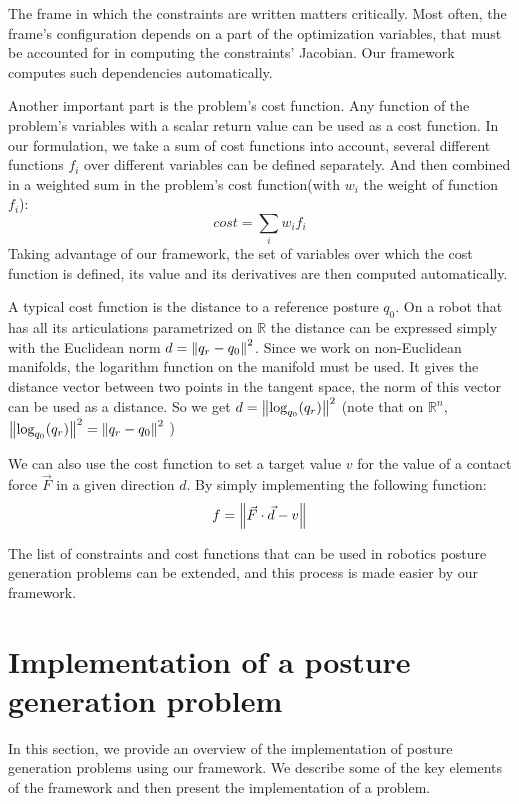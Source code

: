 The frame in which the constraints are written matters critically.
Most often, the frame's configuration depends on a part of the optimization variables, that must be accounted for in computing the constraints' Jacobian.
Our framework computes such dependencies automatically.

Another important part is the problem's cost function.
Any function of the problem's variables with a scalar return value can be used as a cost function.
In our formulation, we take a sum of cost functions into account, several different functions $f_i$ over different variables can be defined separately.
And then combined in a weighted sum in the problem's cost function(with $w_i$ the weight of function $f_i$):
\begin{equation}
  cost = \sum\limits_i w_i f_i
\end{equation}
Taking advantage of our framework, the set of variables over which the cost function is defined, its value and its derivatives are then computed automatically.

A typical cost function is the distance to a reference posture $q_0$.
On a robot that has all its articulations parametrized on $\mathbb{R}$ the distance can be expressed simply with the Euclidean norm $d = \left\| q_r-q_0 \right\|^2$.
Since we work on non-Euclidean manifolds, the logarithm function on the manifold must be used.
It gives the distance vector between two points in the tangent space, the norm of this vector can be used as a distance.
So we get $d = \left\| \text{log}_{q_0}(q_r) \right\|^2$ (note that on $\mathbb{R}^n$, $\left\| \text{log}_{q_0}(q_r) \right\|^2 = \left\| q_r - q_0 \right\|^2$ )

We can also use the cost function to set a target value $v$ for the value of a contact force $\vec{F}$ in a given direction $d$. By simply implementing the following function:
\begin{equation}
  f = \left\| \vec{F}\cdot\vec{d}-v \right\|
\end{equation}

The list of constraints and cost functions that can be used in robotics posture generation problems can be extended, and this process is made easier by our framework.

\section{Implementation of a posture generation problem}
\label{sec:implementation_of_a_posture_generation_problem}

In this section, we provide an overview of the implementation of posture generation problems using our framework. We describe some of the key elements of the framework and then present the implementation of a problem.

